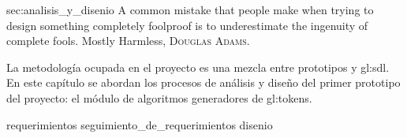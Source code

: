 %
%

{sec:analisis_y_disenio}
{
  \epigrafe
  {%
    A common mistake that people make when trying to design something completely
    foolproof is to underestimate the ingenuity of complete fools.%
  }
  {%
    Mostly Harmless,
    \textsc{Douglas Adams}.%
  }
}

\noindent
La metodología ocupada en el proyecto es una mezcla entre prototipos y
\gls{gl:sdl}. En este capítulo se abordan los procesos de análisis y
diseño del primer prototipo del proyecto: el módulo de algoritmos
generadores de \glspl{gl:token}.

{requerimientos}
{seguimiento_de_requerimientos}
{disenio}
